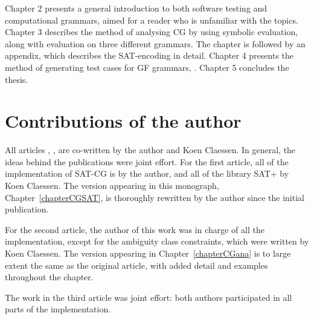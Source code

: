 Chapter 2 presents a general introduction to both software testing and computational grammars, aimed for a reader who is unfamiliar with the topics.
Chapter 3 describes the method of analysing CG by using symbolic evaluation, along with evaluation on three different grammars.
The chapter is followed by an appendix, which describes the SAT-encoding in detail.
Chapter 4 presents the method of generating test cases for GF grammars, .
Chapter 5 concludes the thesis.


\section{Contributions of the author}

All articles \cite{listenmaa_claessen2015}, \cite{listenmaa_claessen2016}, 
are co-written by the author and Koen Claessen. In general, the ideas behind the publications were joint effort.
For the first article, all of the implementation of SAT-CG is by the author,
and all of the library SAT+ by Koen Claessen.
The version appearing in this monograph, Chapter~\ref{chapterCGSAT}, is thoroughly rewritten by the author since the initial publication.

For the second article, the author of this work was in charge of all the implementation, except for the ambiguity class constraints, which were written by Koen Claessen. 
The version appearing in Chapter~\ref{chapterCGana} is to large extent the same as the original article, with added detail and examples throughout the chapter.

The work in the third article was joint effort: both authors participated in all parts of the implementation.


